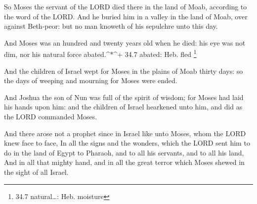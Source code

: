  So Moses the servant of the LORD died there in the land of
Moab, according to the word of the LORD.  And he buried him
in a valley in the land of Moab, over against Beth-peor: but no man
knoweth of his sepulchre unto this day.

 And Moses was an hundred and twenty years old when he died:
his eye was not dim, nor his natural force abated.\^{}*\^{}+ 34.7
abated: Heb. fled \footnote{34.7 natural\ldots: Heb. moisture}

 And the children of Israel wept for Moses in the plains of
Moab thirty days: so the days of weeping and mourning for Moses were
ended.

 And Joshua the son of Nun was full of the spirit of wisdom;
for Moses had laid his hands upon him: and the children of Israel
hearkened unto him, and did as the LORD commanded Moses.

 And there arose not a prophet since in Israel like unto
Moses, whom the LORD knew face to face,  In all the signs
and the wonders, which the LORD sent him to do in the land of Egypt to
Pharaoh, and to all his servants, and to all his land,  And
in all that mighty hand, and in all the great terror which Moses shewed
in the sight of all Israel.
